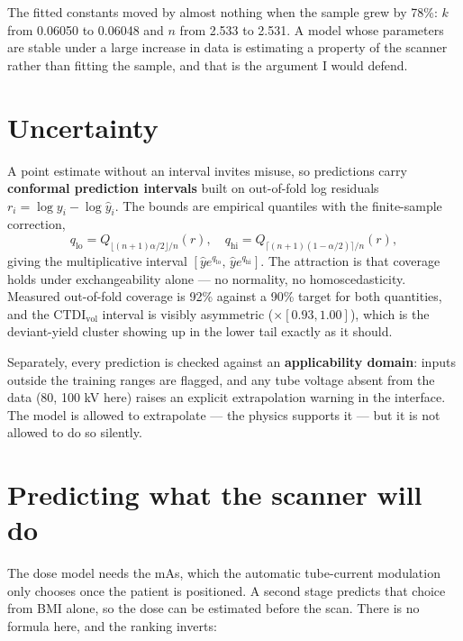 \documentclass[10pt,a4paper,twocolumn]{article}
\newcommand{\ctdi}{\ensuremath{\mathrm{CTDI}_{\mathrm{vol}}}}
\begin{document}
The fitted constants moved by almost nothing when the sample grew by 78\%: $k$ from 0.06050 to 0.06048 and $n$
from 2.533 to 2.531. A model whose parameters are stable under a large increase in data is estimating a
property of the scanner rather than fitting the sample, and that is the argument I would defend.

\section{Uncertainty}

A point estimate without an interval invites misuse, so predictions carry \textbf{conformal prediction
intervals} built on out-of-fold log residuals $r_i=\log y_i-\log\hat y_i$. The bounds are empirical quantiles
with the finite-sample correction,
\[
q_{\mathrm{lo}}=Q_{\lfloor (n+1)\alpha/2\rfloor/n}(r),\quad
q_{\mathrm{hi}}=Q_{\lceil (n+1)(1-\alpha/2)\rceil/n}(r),
\]
giving the multiplicative interval $[\hat y e^{q_{\mathrm{lo}}},\,\hat y e^{q_{\mathrm{hi}}}]$. The attraction is
that coverage holds under exchangeability alone — no normality, no homoscedasticity. Measured out-of-fold
coverage is 92\% against a 90\% target for both quantities, and the \ctdi{} interval is visibly asymmetric
($\times[0.93,1.00]$), which is the deviant-yield cluster showing up in the lower tail exactly as it should.

Separately, every prediction is checked against an \textbf{applicability domain}: inputs outside the training
ranges are flagged, and any tube voltage absent from the data (80, 100 kV here) raises an explicit
extrapolation warning in the interface. The model is allowed to extrapolate — the physics supports it — but it
is not allowed to do so silently.

\section{Predicting what the scanner will do}

The dose model needs the mAs, which the automatic tube-current modulation only chooses once the patient is
positioned. A second stage predicts that choice from BMI alone, so the dose can be estimated before the scan.
There is no formula here, and the ranking inverts:
\end{document}
